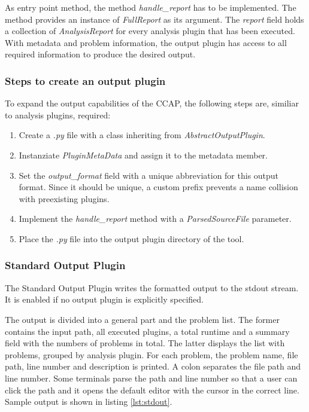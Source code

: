 As entry point method, the method \textit{handle\_report} has to be implemented. The method provides an instance of \textit{FullReport} as its argument. The  \textit{report} field holds a collection of  \textit{AnalysisReport} for every analysis plugin that has been executed. With metadata and problem information, the output plugin has access to all required information to produce the desired output.

\subsubsection{Steps to create an output plugin}
To expand the output capabilities of the CCAP, the following steps are, similiar to analysis plugins, required:
\begin{enumerate}
    \item Create a \textit{.py} file with a class inheriting from \textit{AbstractOutputPlugin}.
    \item Instanziate \textit{PluginMetaData} and assign it to the metadata member.
    \item Set the \textit{output\_format} field with a unique abbreviation for this output format. Since it should be unique, a custom prefix prevents a name collision with preexisting plugins.
    \item Implement the \textit{handle\_report} method with a \textit{ParsedSourceFile} parameter. 
    \item Place the \textit{.py} file into the output plugin directory of the tool.
\end{enumerate}

\subsubsection{Standard Output Plugin}
The Standard Output Plugin writes the formatted output to the stdout stream. It is enabled if no output plugin is explicitly specified. 

The output is divided into a general part and the problem list. The former contains the input path, all executed plugins, a total runtime and a summary field with the numbers of problems in total. The latter displays the list with problems, grouped by analysis plugin.  
For each problem, the problem name, file path, line number and description is printed. A colon separates the file path and line number. Some terminals parse the path and line number so that a user can click the path and it opens the default editor with the cursor in the correct line. Sample output is shown in listing \ref{lst:stdout}.

